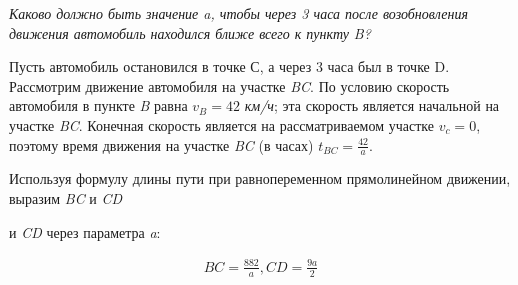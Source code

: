 \documentclass{article}
\begin{document}
\twocolumn

\emph{Каково должно быть значение a, чтобы через 3 часа после возобновления движения автомобиль находился ближе всего к пункту B?}

Пусть автомобиль остановился в точке С, а через 3 часа был в точке D.
Рассмотрим движение автомобиля на участке \emph{BC}. По условию скорость автомобиля в пункте \emph{B} равна 
\begin{math}
    v_{B} = 42
\end{math} \emph{км/ч}; эта скорость является начальной на участке \emph{BC}. Конечная скорость является на рассматриваемом участке 
\begin{math}
    v_{c} = 0 
\end{math}, поэтому время движения на участке \emph{BC} (в часах) \begin{math}
 t_{BC} = \frac{42}{a}   
\end{math}.

Используя формулу длины пути при равнопеременном прямолинейном движении, выразим \emph{BC} и \emph{CD}


и \emph{CD} через параметра \emph{a}:

\begin{ceqn}
\begin{align}
BC = \frac{882}{a}, CD=\frac{9a}{2}
\end{align}
\end{ceqn}
\end{document}
